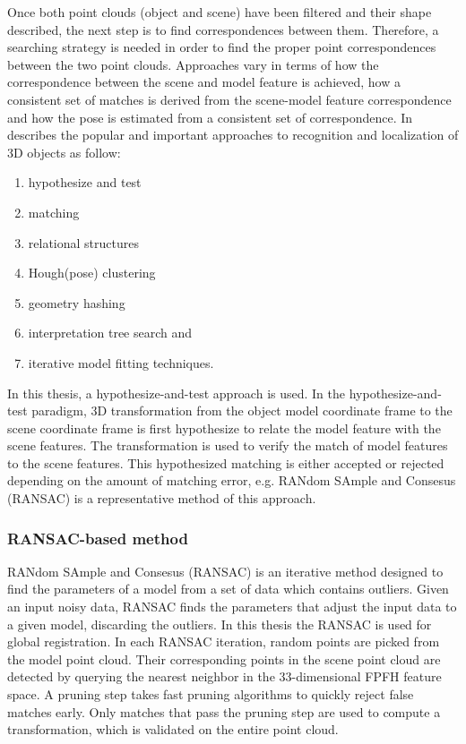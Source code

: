 Once both point clouds (object and scene) have been filtered and their shape described, the next step is to find correspondences between them. Therefore, a searching strategy is needed in order to find the proper point correspondences between the two point clouds. Approaches vary in terms of how the correspondence between the scene and model feature is achieved, how a consistent set of matches is derived from the scene-model feature correspondence and how the pose is estimated from a consistent set of correspondence. In \cite{repMatching} describes the popular and important approaches to recognition and localization of 3D objects as follow: 
\begin{enumerate}
    \item hypothesize and test
    \item matching
    \item relational structures
    \item Hough(pose) clustering
    \item geometry hashing
    \item interpretation tree search and
    \item iterative model fitting techniques.
\end{enumerate}

In this thesis, a hypothesize-and-test approach is used. In the hypothesize-and-test paradigm, 3D transformation from the object model coordinate frame to the scene coordinate frame is first hypothesize to relate the model feature with the scene features. The transformation is used to verify the match of model features to the scene features. This hypothesized matching is either accepted or rejected depending on the amount of matching error, e.g.  RANdom SAmple and Consesus (RANSAC) is a representative method of this approach.

\subsubsection{RANSAC-based method} \label{sssec:num1}

RANdom SAmple and Consesus (RANSAC)\cite{repMatching} is an iterative method designed to find the parameters of a model from a set of data which contains outliers. Given an input noisy data, RANSAC finds the parameters that adjust the input data to a given model, discarding the outliers. In this thesis the RANSAC is used for global registration. In each RANSAC iteration, random points are picked from the model point cloud. Their corresponding points in the scene point cloud are detected by querying the nearest neighbor in the 33-dimensional FPFH feature space. A pruning step takes fast pruning algorithms to quickly reject false matches early. Only matches that pass the pruning step are used to compute a transformation, which is validated on the entire point cloud. 

